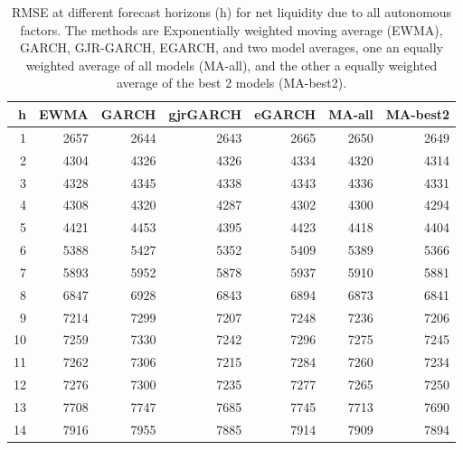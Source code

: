 \begin{table}[ht]
\centering
\begin{tabular}{rrrrrrr}
  \hline
h & EWMA & GARCH & gjrGARCH & eGARCH & MA-all & MA-best2 \\ 
  \hline
1 & 2657 & 2644 & 2643 & 2665 & 2650 & 2649 \\ 
  2 & 4304 & 4326 & 4326 & 4334 & 4320 & 4314 \\ 
  3 & 4328 & 4345 & 4338 & 4343 & 4336 & 4331 \\ 
  4 & 4308 & 4320 & 4287 & 4302 & 4300 & 4294 \\ 
  5 & 4421 & 4453 & 4395 & 4423 & 4418 & 4404 \\ 
  6 & 5388 & 5427 & 5352 & 5409 & 5389 & 5366 \\ 
  7 & 5893 & 5952 & 5878 & 5937 & 5910 & 5881 \\ 
  8 & 6847 & 6928 & 6843 & 6894 & 6873 & 6841 \\ 
  9 & 7214 & 7299 & 7207 & 7248 & 7236 & 7206 \\ 
  10 & 7259 & 7330 & 7242 & 7296 & 7275 & 7245 \\ 
  11 & 7262 & 7306 & 7215 & 7284 & 7260 & 7234 \\ 
  12 & 7276 & 7300 & 7235 & 7277 & 7265 & 7250 \\ 
  13 & 7708 & 7747 & 7685 & 7745 & 7713 & 7690 \\ 
  14 & 7916 & 7955 & 7885 & 7914 & 7909 & 7894 \\ 
   \hline
\end{tabular}
\caption{RMSE at different forecast horizons (h) for net liquidity due to all autonomous factors. The methods are Exponentially weighted moving average (EWMA), GARCH, GJR-GARCH, EGARCH, and two model averages, one an equally weighted average of all models (MA-all), and the other a equally weighted average of the best 2 models (MA-best2).} 
\label{tab:rmseagg}
\end{table}

